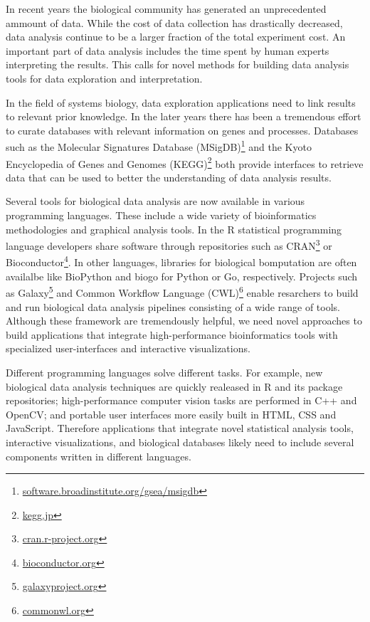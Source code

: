 In recent years the biological community has  generated  an
unprecedented ammount of data. While the cost of data collection has
drastically decreased, data analysis continue to be a larger fraction of the
total experiment cost.\cite{sboner2011real}  An important part of data analysis
includes the time spent by human experts interpreting the results. This calls
for novel methods for building data analysis tools for data exploration and
interpretation. 

In the field of systems biology, data exploration applications need to link
results to relevant prior knowledge. In the later years there has been a
tremendous effort to curate databases with relevant information on genes and
processes. Databases such as the Molecular Signatures Database
(MSigDB)\footnote{\url{software.broadinstitute.org/gsea/msigdb}} and the Kyoto
Encyclopedia of Genes and Genomes (KEGG)\footnote{\url{kegg.jp}} both provide
interfaces to retrieve data that can be used to better the understanding of
data analysis results. 

Several tools for biological data analysis are now available in various
programming languages. These include a wide variety of bioinformatics
methodologies and graphical analysis tools.
In the R statistical programming language developers share software through
repositories such as CRAN\footnote{\url{cran.r-project.org}} or
Bioconductor\footnote{\url{bioconductor.org}}.  In other languages, libraries
for biological bomputation are often availalbe like BioPython\cite{biopython}
and biogo\cite{biogo} for Python or Go, respectively. Projects such as
Galaxy\footnote{\url{galaxyproject.org}} and Common Workflow Language
(CWL)\footnote{\url{commonwl.org}} enable resarchers to build and run
biological data analysis pipelines consisting of a wide range of tools.
Although these framework are tremendously helpful, we need novel approaches to
build applications that integrate high-performance bioinformatics tools with 
specialized user-interfaces and interactive visualizations.

Different programming languages solve different tasks.  For example, new
biological data analysis techniques are quickly realeased in R and its package
repositories; high-performance computer vision tasks are performed in C++ and
OpenCV; and portable user interfaces more easily built in HTML, CSS and
JavaScript.  
Therefore applications that integrate novel statistical
analysis tools, interactive visualizations, and biological databases likely
need to include several components written in different languages. 

